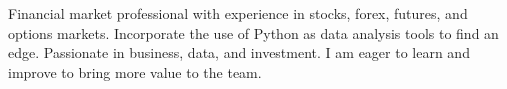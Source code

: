 

\begin{cvparagraph}

Financial market professional with experience in stocks, forex, futures, and options markets. Incorporate the use of Python as data analysis tools to find an edge. Passionate in business, data, and investment. I am eager to learn and improve to bring more value to the team.
\end{cvparagraph}
